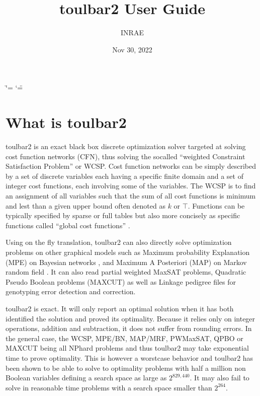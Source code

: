 \documentclass[letterpaper,10pt,openany,oneside,english]{sphinxmanual}
\title{toulbar2 User Guide}
\date{Nov 30, 2022}
\author{INRAE}
\begin{document}
\ifdefined\shorthandoff
  \ifnum\catcode`\=\string=\active\shorthandoff{=}\fi
  \ifnum\catcode`\"=\active{}\fi
\fi

\pagestyle{empty}
\sphinxmaketitle
\pagestyle{plain}
\sphinxtableofcontents
\pagestyle{normal}
\label{\detokenize{userdoc::doc}}



\chapter{What is toulbar2}
\label{\detokenize{userdoc:what-is-toulbar2}}
\sphinxAtStartPar
toulbar2 is an exact black box discrete optimization solver targeted
at solving cost function networks (CFN), thus solving the so\sphinxhyphen{}called
“weighted Constraint Satisfaction Problem” or WCSP. Cost function
networks can be simply described by a set of discrete variables each
having a specific finite domain and a set of integer cost functions,
each involving some of the variables. The WCSP is to find an
assignment of all variables such that the sum of all cost functions is
minimum and lest than a given upper bound often denoted as \(k\) or
\(\top\). Functions can be typically specified by sparse or full tables
but also more concisely as specific functions called “global cost
functions” .

\sphinxAtStartPar
Using on the fly translation, toulbar2 can also directly solve
optimization problems on other graphical models such as Maximum
probability Explanation (MPE) on Bayesian networks , and
Maximum A Posteriori (MAP) on Markov random field . It can also
read partial weighted MaxSAT problems, Quadratic Pseudo Boolean
problems (MAXCUT) as well as Linkage  pedigree files for
genotyping error detection and correction.

\sphinxAtStartPar
toulbar2 is exact. It will only report an optimal solution when it
has both identified the solution and proved its optimality. Because it
relies only on integer operations, addition and subtraction, it does
not suffer from rounding errors. In the general case, the WCSP,
MPE/BN, MAP/MRF, PWMaxSAT, QPBO or MAXCUT being all NP\sphinxhyphen{}hard problems
and thus toulbar2 may take exponential time to prove optimality. This
is however a worst\sphinxhyphen{}case behavior and toulbar2 has been shown to be
able to solve to optimality problems with half a million non Boolean
variables defining a search space as large as \(2^{829,440}\). It may
also fail to solve in reasonable time problems with a search space
smaller than \(2^{264}\).
\end{document}
